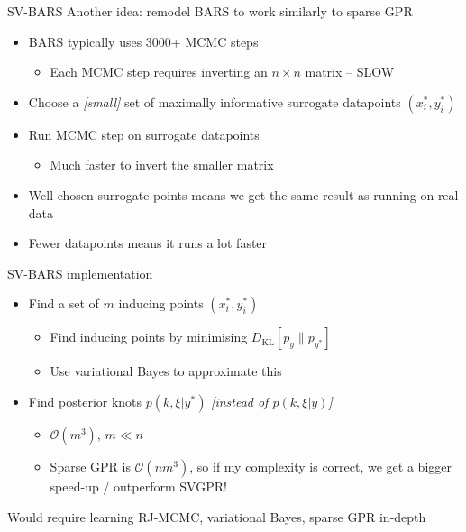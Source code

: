 \documentclass[presentation]{beamer}
\begin{document}
\begin{frame}[label={sec:org63f7bd8}]{SV-BARS}
Another idea: remodel BARS to work similarly to sparse GPR

\vfill
\begin{itemize}
\item BARS typically uses 3000+ MCMC steps
\begin{itemize}
\item Each MCMC step requires inverting an \(n \times n\) matrix -- SLOW
\end{itemize}
\item Choose a \emph{[small]} set of maximally informative surrogate datapoints \((x_i^*, y_i^*)\)
\item Run MCMC step on surrogate datapoints
\begin{itemize}
\item Much faster to invert the smaller matrix
\end{itemize}
\item Well-chosen surrogate points means we get the same result as running on real data
\item Fewer datapoints means it runs a lot faster
\end{itemize}
\end{frame}

\begin{frame}[label={sec:orgb5e7b7e}]{SV-BARS implementation}
\begin{itemize}
\item Find a set of \(m\) inducing points \((x_i^*, y_i^*)\)
\begin{itemize}
\item Find inducing points by minimising \(D_\mathrm{KL}\left[p_y \| p_{y^*}\right]\)
\item Use variational Bayes to approximate this
\end{itemize}
\item Find posterior knots \(p(k, \xi | y^*)\) \emph{[instead of \(p(k,\xi | y)\)]}
\begin{itemize}
\item \(\mathcal{O}(m^3)\), \(m\ll n\)
\item Sparse GPR is \(\mathcal{O}(nm^3)\), so if my complexity is correct, we get a bigger speed-up / outperform SVGPR!
\end{itemize}
\end{itemize}


\vfill
Would require learning RJ-MCMC, variational Bayes, sparse GPR in-depth
\end{frame}
\end{document}
